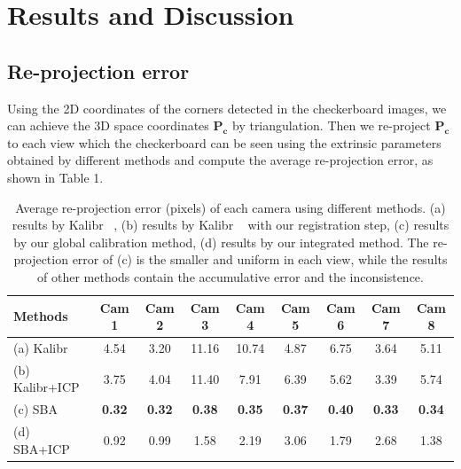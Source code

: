 
\section{Results and Discussion}
\label{sec:Results}



\subsection{Re-projection error}
Using the 2D coordinates of the corners detected in the checkerboard images, we can achieve the 3D space coordinates $\mathbf{P_{c}}$ by triangulation. Then we re-project $\mathbf{P_{c}}$ to each view which the checkerboard can be seen using the extrinsic parameters obtained by different methods and compute the average re-projection error, as shown in Table 1.
\begin{table}
	\centering
	\caption{Average re-projection error (pixels) of each camera using different methods. (a) results by Kalibr ~\cite{Maye2013Self}, (b) results by Kalibr ~\cite{Maye2013Self} with our registration step, (c) results by our global calibration method, (d) results by our integrated method. The re-projection error of (c) is the smaller and uniform in each view, while the results of other methods contain the accumulative error and the inconsistence. }
	\label{tab:reprojection}
	\begin{tabular}{lcccccccc}
		\hline
		Methods & Cam 1 & Cam 2 & Cam 3 & Cam 4 & Cam 5 & Cam 6 & Cam 7 & Cam 8\\
		\hline
		(a) Kalibr &4.54 &3.20 &11.16 &10.74 &4.87 &6.75 &3.64 &5.11\\

		(b) Kalibr+ICP &3.75 &4.04 &11.40 &7.91 &6.39 &5.62 &3.39 &5.74\\
		
		(c) SBA   &\textbf{0.32} &\textbf{0.32} &\textbf{0.38}  &\textbf{0.35} &\textbf{0.37} &\textbf{0.40} &\textbf{0.33} &\textbf{0.34} \\
		
		(d) SBA+ICP &0.92 &0.99 &1.58 &2.19 &3.06 &1.79 &2.68 &1.38\\
		\hline
		
	\end{tabular}


\end{table}


